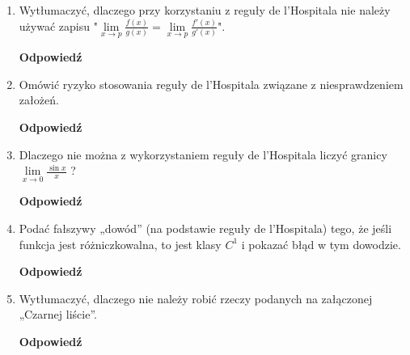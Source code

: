 \documentclass[12pt,a4paper]{article}
\theoremstyle{break}
\newcommand{\Odp}[1]{
		\begin{mdframed}[style=zadanie]
			\textbf{Odpowiedź}\\
			#1
		\end{mdframed}
	}
\begin{document}
\begin{enumerate}[1.]
{	}
	
	\item Wytłumaczyć, dlaczego przy korzystaniu z reguły de l’Hospitala nie należy używać zapisu "$\lim\limits_{x\rightarrow p} \frac{f(x)}{g(x)} = \lim\limits_{x\rightarrow p} \frac{f'(x)}{g'(x)}$".
	\Odp{
	
	}
	
	\item Omówić ryzyko stosowania reguły de l’Hospitala związane z niesprawdzeniem założeń.
	\Odp{
	
	}
	
	\item Dlaczego nie można z wykorzystaniem reguły de l’Hospitala liczyć granicy $\lim\limits_{x\rightarrow0}\frac{\sin x}{x}$ ?
	\Odp{
	
	}
	
	\item Podać fałszywy „dowód” (na podstawie reguły de l’Hospitala) tego, że jeśli funkcja jest różniczkowalna, to jest klasy $C^1$ i pokazać błąd w tym dowodzie.
	\Odp{
	
	}
	
	\item Wytłumaczyć, dlaczego nie należy robić rzeczy podanych na załączonej „Czarnej liście”.
	\Odp{
	
	}
	
	\end{enumerate}
	
\end{document}

